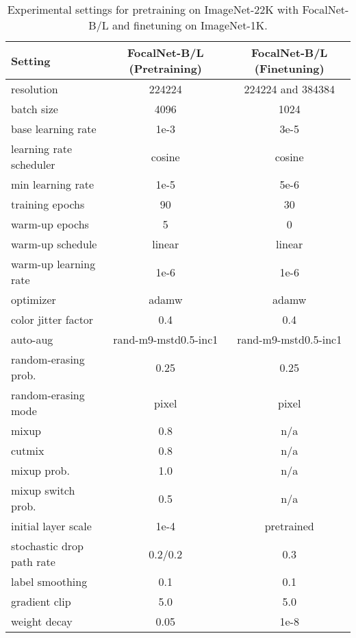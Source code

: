 \documentclass{article}
\begin{document}
\begin{table}[t]
    \centering
    \footnotesize
    \begin{tabular}{l | c c}
    \toprule
        Setting & FocalNet-B/L (Pretraining) &
        FocalNet-B/L (Finetuning) \\
        \midrule
        resolution          &  224224 & 224224 and 384384 \\
        batch size          &  4096 & 1024   \\
        base learning rate  &  1e-3 & 3e-5   \\
        learning rate scheduler & cosine & cosine \\
        min learning rate   & 1e-5   & 5e-6 \\
        training epochs     &  90  & 30    \\
        warm-up epochs      &  5   & 0     \\
        warm-up schedule    & linear & linear \\
        warm-up learning rate & 1e-6  & 1e-6 \\
        optimizer          & adamw   & adamw \\
        \midrule
        color jitter factor & 0.4   & 0.4 \\
        auto-aug          & rand-m9-mstd0.5-inc1 & rand-m9-mstd0.5-inc1 \\
        random-erasing prob. & 0.25 & 0.25 \\
        random-erasing mode  & pixel & pixel \\
        mixup           & 0.8   & n/a \\
        cutmix          & 0.8   & n/a \\
        mixup prob.             & 1.0   & n/a \\
        mixup switch prob.      & 0.5   & n/a \\
        initial layer scale             & 1e-4  & pretrained \\
        \midrule
        stochastic drop path rate & 0.2/0.2 & 0.3 \\
        label smoothing        & 0.1  & 0.1 \\
        gradient clip          & 5.0  & 5.0 \\
        weight decay           & 0.05 & 1e-8 \\
        
    \bottomrule
    \end{tabular}
    \caption{Experimental settings for pretraining on ImageNet-22K with FocalNet-B/L and finetuning on ImageNet-1K.}
    \label{tab:config4imagenet22k}
\end{table}
\end{document}

